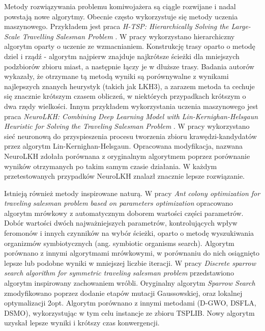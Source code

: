 Metody rozwiązywania problemu komiwojażera są ciągle rozwijane i nadal powstają nowe algorytmy.
Obecnie często wykorzystuje się metody uczenia maszynowego.
Przykładem jest praca \textit{H-TSP: Hierarchically Solving the Large-Scale Travelling Salesman Problem} \cite{DBLP:journals/corr/abs-2304-09395}.
W pracy wykorzystano hierarchiczny algorytm oparty o uczenie ze wzmacnianiem. Konstrukcję trasy oparto o metodę dziel i rządź - algorytm
najpierw znajduje najkrótsze ścieżki dla mniejszych podzbiorów zbioru miast, a następnie łączy je w dłuższe trasy.
Badania autorów wykazały, że otrzymane tą metodą wyniki są porównywalne z wynikami najlepszych znanych heurystyk (takich jak LKH3),
a zarazem metoda ta cechuje się znacznie krótszym czasem obliczeń, w niektórych przypadkach krótszym o dwa rzędy wielkości.
Innym przykładem wykorzystania uczenia maszynowego jest praca \textit{NeuroLKH: Combining Deep Learning Model with
Lin-Kernighan-Helsgaun Heuristic for Solving the Traveling Salesman Problem} \cite{DBLP:conf/nips/XinSCZ21}.
W pracy wykorzystano sieć neuronową do przyspieszenia procesu tworzenia zbioru krawędzi-kandydatów przez algorytm Lin-Kernighan-Helsgaun.
Opracowana modyfikacja, nazwana NeuroLKH zdołała porównana z oryginalnym algorytmem poprzez porównanie wyników otrzymanych po takim samym czasie działania.
W każdym przetestowanych przypadków NeuroLKH znalazł znacznie lepsze rozwiązanie.

Istnieją również metody inspirowane naturą.
W pracy \textit{Ant colony optimization for traveling salesman problem based on parameters optimization}
opracowano algorytm mrówkowy z automatycznym doborem wartości części parametrów.
Dobór wartości dwóch najważniejszych parametrów, kontrolujących wpływ feromonów i innych czynników na wybór ścieżki,
oparto o metodę wyszukiwania organizmów symbiotycznych (ang. symbiotic organisms search).
Algorytm porównano z innymi algorytmami mrówkowymi, w porównaniu do nich osiągnięto lepsze lub podobne wyniki w mniejszej liczbie iteracji.
W pracy \textit{Discrete sparrow search algorithm for symmetric traveling salesman problem} \cite{DBLP:journals/asc/ZhangH22} przedstawiono algorytm inspirowany zachowaniem wróbli.
Oryginalny algorytm \textit{Sparrow Search} zmodyfikowano poprzez dodanie etapów mutacji Gaussowskiej, oraz lokalnej optymalizacji 2opt.
Algorytm porównano z innymi metodami (D-GWO, DSFLA, DSMO), wykorzystując w tym celu instancje ze zbioru TSPLIB.
Nowy algorytm uzyskał lepsze wyniki i krótszy czas konwergencji.

